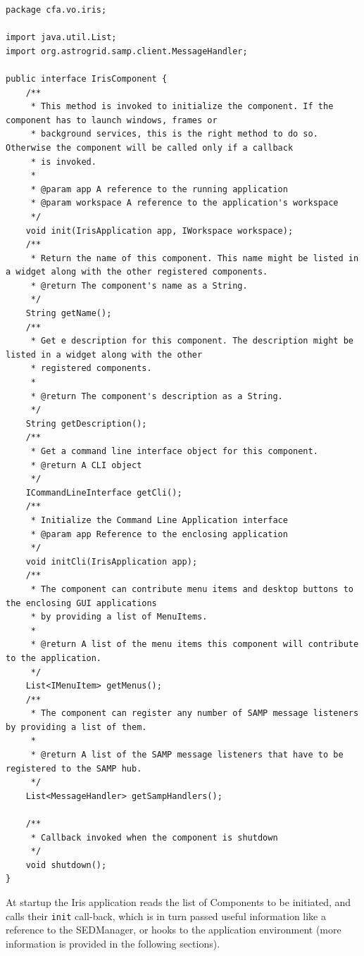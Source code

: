 \documentclass[5p]{elsarticle}
\begin{document}
\begin{lstlisting}[style=java,
	caption={This snippet of code represents the main interface that all components in Iris have to implement, and how dependencies get injected into the components at runtime.},
	label=lst:component]
package cfa.vo.iris;

import java.util.List;
import org.astrogrid.samp.client.MessageHandler;

public interface IrisComponent {
    /**
     * This method is invoked to initialize the component. If the component has to launch windows, frames or
     * background services, this is the right method to do so. Otherwise the component will be called only if a callback
     * is invoked.
     *
     * @param app A reference to the running application
     * @param workspace A reference to the application's workspace
     */
    void init(IrisApplication app, IWorkspace workspace);
    /**
     * Return the name of this component. This name might be listed in a widget along with the other registered components.
     * @return The component's name as a String.
     */
    String getName();
    /**
     * Get e description for this component. The description might be listed in a widget along with the other
     * registered components.
     *
     * @return The component's description as a String.
     */
    String getDescription();
    /**
     * Get a command line interface object for this component.
     * @return A CLI object
     */
    ICommandLineInterface getCli();
    /**
     * Initialize the Command Line Application interface
     * @param app Reference to the enclosing application
     */
    void initCli(IrisApplication app);
    /**
     * The component can contribute menu items and desktop buttons to the enclosing GUI applications
     * by providing a list of MenuItems.
     *
     * @return A list of the menu items this component will contribute to the application.
     */
    List<IMenuItem> getMenus();
    /**
     * The component can register any number of SAMP message listeners by providing a list of them.
     *
     * @return A list of the SAMP message listeners that have to be registered to the SAMP hub.
     */
    List<MessageHandler> getSampHandlers();

    /**
     * Callback invoked when the component is shutdown
     */
    void shutdown();
}
\end{lstlisting}

At startup the Iris application reads the list of Components to be initiated, and calls their \verb|init| call-back, which is in turn passed useful information like a reference to the SEDManager, or hooks to the application environment (more information is provided in the following sections).
\end{document}
